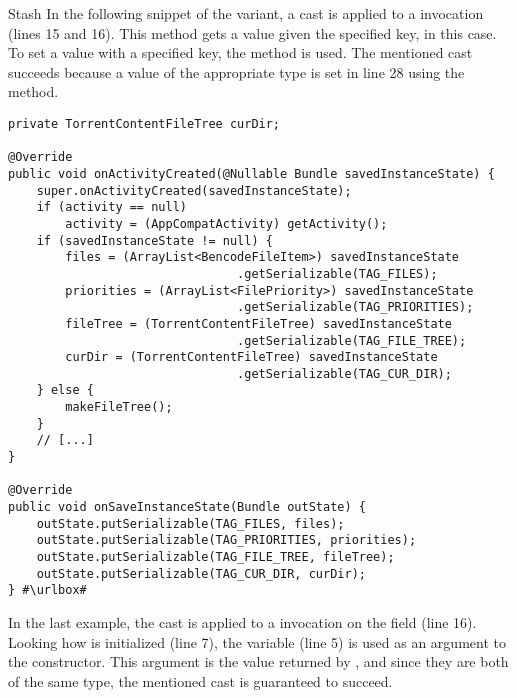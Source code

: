 \begin{pattern}{Stash}
In the following snippet of the  variant,
a cast is applied to a  invocation (lines 15 and 16).
This method gets a  value given the specified key,  in this case.
To set a value with a specified key, the  method is used.
The mentioned cast succeeds because a value of the appropriate type is set in line 28 using the  method.

\def\urlvar{http://bit.ly/proninyaroslav_libretorrent_2TxpZCM}
\begin{verbatim}
private TorrentContentFileTree curDir;

@Override
public void onActivityCreated(@Nullable Bundle savedInstanceState) {
    super.onActivityCreated(savedInstanceState);
    if (activity == null)
        activity = (AppCompatActivity) getActivity();
    if (savedInstanceState != null) {
        files = (ArrayList<BencodeFileItem>) savedInstanceState
                                .getSerializable(TAG_FILES);
        priorities = (ArrayList<FilePriority>) savedInstanceState
                                .getSerializable(TAG_PRIORITIES);
        fileTree = (TorrentContentFileTree) savedInstanceState
                                .getSerializable(TAG_FILE_TREE);
        curDir = (TorrentContentFileTree) savedInstanceState
                                .getSerializable(TAG_CUR_DIR);
    } else {
        makeFileTree();
    }
    // [...]
}

@Override
public void onSaveInstanceState(Bundle outState) {
    outState.putSerializable(TAG_FILES, files);
    outState.putSerializable(TAG_PRIORITIES, priorities);
    outState.putSerializable(TAG_FILE_TREE, fileTree);
    outState.putSerializable(TAG_CUR_DIR, curDir);
} #\urlbox#
\end{verbatim}

In the last example,
the cast is applied to a  invocation on the  field (line 16).
Looking how  is initialized (line 7),
the  variable (line 5) is used as an argument to the constructor.
This argument is the value returned by ,
and since they are both of the same type,
the mentioned cast is guaranteed to succeed.


\end{pattern}

